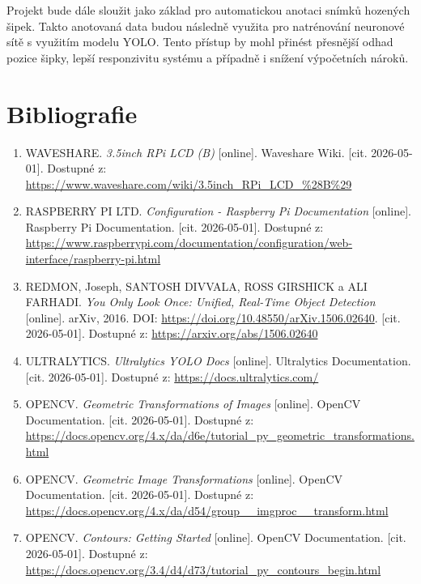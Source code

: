 \documentclass[12pt]{article}
\newcommand{\docsection}[1]{\section*{#1}\addcontentsline{toc}{section}{#1}}
\begin{document}
Projekt bude dále sloužit jako základ pro automatickou anotaci snímků hozených šipek. Takto anotovaná data budou následně využita pro natrénování neuronové sítě s využitím modelu YOLO. Tento přístup by mohl přinést přesnější odhad pozice šipky, lepší responzivitu systému a případně i snížení výpočetních nároků.

\clearpage
\docsection{Bibliografie}

\begin{enumerate}
\item WAVESHARE. \textit{3.5inch RPi LCD (B)} [online]. Waveshare Wiki. [cit. 2026-05-01]. Dostupné z: \url{https://www.waveshare.com/wiki/3.5inch_RPi_LCD_%28B%29}

\item RASPBERRY PI LTD. \textit{Configuration - Raspberry Pi Documentation} [online]. Raspberry Pi Documentation. [cit. 2026-05-01]. Dostupné z: \url{https://www.raspberrypi.com/documentation/configuration/web-interface/raspberry-pi.html}

\item REDMON, Joseph, SANTOSH DIVVALA, ROSS GIRSHICK a ALI FARHADI. \textit{You Only Look Once: Unified, Real-Time Object Detection} [online]. arXiv, 2016. DOI: \url{https://doi.org/10.48550/arXiv.1506.02640}. [cit. 2026-05-01]. Dostupné z: \url{https://arxiv.org/abs/1506.02640}

\item ULTRALYTICS. \textit{Ultralytics YOLO Docs} [online]. Ultralytics Documentation. [cit. 2026-05-01]. Dostupné z: \url{https://docs.ultralytics.com/}

\item OPENCV. \textit{Geometric Transformations of Images} [online]. OpenCV Documentation. [cit. 2026-05-01]. Dostupné z: \url{https://docs.opencv.org/4.x/da/d6e/tutorial_py_geometric_transformations.html}

\item OPENCV. \textit{Geometric Image Transformations} [online]. OpenCV Documentation. [cit. 2026-05-01]. Dostupné z: \url{https://docs.opencv.org/4.x/da/d54/group__imgproc__transform.html}

\item OPENCV. \textit{Contours: Getting Started} [online]. OpenCV Documentation. [cit. 2026-05-01]. Dostupné z: \url{https://docs.opencv.org/3.4/d4/d73/tutorial_py_contours_begin.html}
\end{enumerate}
\end{document}
